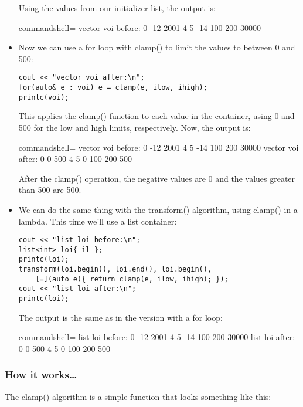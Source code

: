 \begin{itemize}
Using the values from our initializer list, the output is:

\begin{tcblisting}{commandshell={}}
vector voi before:
0 -12 2001 4 5 -14 100 200 30000
\end{tcblisting}

\item 
Now we can use a for loop with clamp() to limit the values to between 0 and 500:

\begin{lstlisting}[style=styleCXX]
cout << "vector voi after:\n";
for(auto& e : voi) e = clamp(e, ilow, ihigh);
printc(voi);
\end{lstlisting}

This applies the clamp() function to each value in the container, using 0 and 500 for the low and high limits, respectively. Now, the output is:

\begin{tcblisting}{commandshell={}}
vector voi before:
0 -12 2001 4 5 -14 100 200 30000
vector voi after:
0 0 500 4 5 0 100 200 500
\end{tcblisting}

After the clamp() operation, the negative values are 0 and the values greater than 500 are 500.

\item 
We can do the same thing with the transform() algorithm, using clamp() in a lambda. This time we'll use a list container:

\begin{lstlisting}[style=styleCXX]
cout << "list loi before:\n";
list<int> loi{ il };
printc(loi);
transform(loi.begin(), loi.end(), loi.begin(),
	[=](auto e){ return clamp(e, ilow, ihigh); });
cout << "list loi after:\n";
printc(loi);
\end{lstlisting}

The output is the same as in the version with a for loop:

\begin{tcblisting}{commandshell={}}
list loi before:
0 -12 2001 4 5 -14 100 200 30000
list loi after:
0 0 500 4 5 0 100 200 500
\end{tcblisting}
\end{itemize}

\subsubsection{How it works…}

The clamp() algorithm is a simple function that looks something like this:

